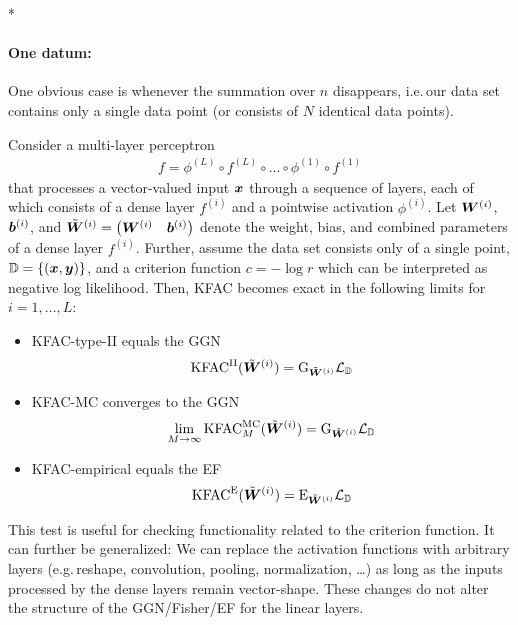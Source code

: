 \switchcolumn[1]*
\switchcolumn[0]

\paragraph{One datum:} One obvious case is whenever the summation over $n$ disappears, i.e.\,our data set contains only a single data point (or consists of $N$ identical data points).
\begin{test}
  Consider a multi-layer perceptron
  \begin{align*}
    f = \phi^{(L)} \circ f^{(L)} \circ \ldots \circ \phi^{(1)} \circ f^{(1)}
  \end{align*}
  that processes a vector-valued input ${\bm{x}}$ through a sequence of layers, each of which consists of a dense layer $f^{(i)}$ and a pointwise activation $\phi^{(i)}$.
  Let ${\bm{W}}^{(i)}$, ${\bm{b}}^{(i)}$, and $\tilde{{\bm{W}}}^{(i)} = \begin{pmatrix} {\bm{W}}^{(i)} & {\bm{b}}^{(i)} \end{pmatrix}$ denote the weight, bias, and combined parameters of a dense layer $f^{(i)}$.
  Further, assume the data set consists only of a single point, ${\mathbb{D}} = \{ ({\bm{x}}, {\bm{y}}) \}$, and a criterion function $c = - \log r$ which can be interpreted as negative log likelihood.
  Then, KFAC becomes exact in the following limits for $i = 1, \dots, L$:
  \begin{itemize}
  \item KFAC-type-II equals the GGN
    \begin{align*}
      \mathrm{KFAC}^{\text{II}}(\tilde{{\bm{W}}}^{(i)}) = \mathrm{G}_{\tilde{{\bm{W}}}^{(i)}}{\mathcal{L}}_{{\mathbb{D}}}
    \end{align*}
  \item KFAC-MC converges to the GGN
    \begin{align*}
      \lim_{M \to \infty} \mathrm{KFAC}^{\text{MC}}_M(\tilde{{\bm{W}}}^{(i)}) = \mathrm{G}_{\tilde{{\bm{W}}}^{(i)}}{\mathcal{L}}_{{\mathbb{D}}}
    \end{align*}
  \item KFAC-empirical equals the EF
    \begin{align*}
      \mathrm{KFAC}^{\text{E}}(\tilde{{\bm{W}}}^{(i)}) = \mathrm{E}_{\tilde{{\bm{W}}}^{(i)}}{\mathcal{L}}_{{\mathbb{D}}}
    \end{align*}
  \end{itemize}
\end{test}
This test is useful for checking functionality related to the criterion function.
It can further be generalized: We can replace the activation functions with arbitrary layers (e.g.\,reshape, convolution, pooling, normalization, \dots) as long as the inputs processed by the dense layers remain vector-shape.
These changes do not alter the structure of the GGN/Fisher/EF for the linear layers.


